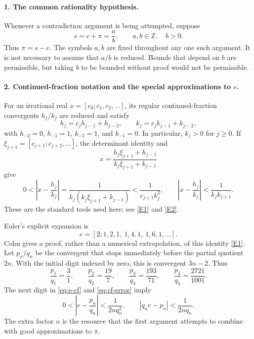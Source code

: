 \documentclass[11pt]{article}
\newcommand{\Z}{\mathbb Z}
\begin{document}
\paragraph{1. The common rationality hypothesis.}
Whenever a contradiction argument is being attempted, suppose
\begin{equation}\label{eq:rationality}
 s=e+\pi=\frac ab,\qquad a,b\in\Z,\quad b>0.
\end{equation}
Thus $\pi=s-e$. The symbols $a,b$ are fixed throughout any one such
argument. It is not necessary to assume that $a/b$ is reduced. Bounds that
depend on $b$ are permissible, but taking $b$ to be bounded without proof
would not be permissible.

\paragraph{2. Continued-fraction notation and the special approximations to $e$.}
For an irrational real $x=[c_0;c_1,c_2,\ldots]$, its regular
continued-fraction convergents $h_j/k_j$ are reduced and satisfy
\[
 h_j=c_jh_{j-1}+h_{j-2},\qquad
 k_j=c_jk_{j-1}+k_{j-2},
\]
with $h_{-2}=0$, $h_{-1}=1$, $k_{-2}=1$, and $k_{-1}=0$.
In particular, $k_j>0$ for $j\ge0$.
If $\xi_{j+1}=[c_{j+1};c_{j+2},\ldots]$, the determinant identity and
\[
 x=\frac{h_j\xi_{j+1}+h_{j-1}}{k_j\xi_{j+1}+k_{j-1}}
\]
give
\begin{equation}\label{eq:cf-error}
 0<\left|x-\frac{h_j}{k_j}\right|
 =\frac1{k_j(k_j\xi_{j+1}+k_{j-1})}
 <\frac1{c_{j+1}k_j^2},\qquad
 \left|x-\frac{h_j}{k_j}\right|<\frac1{k_jk_{j+1}}.
\end{equation}
These are the standard tools used here; see
\href{https://arxiv.org/html/math/0601660v3}{[E1]} and
\href{https://wstein.org/edu/2007/spring/ent/ent-html/node65.html}{[E2]}.

Euler's explicit expansion is
\begin{equation}\label{eq:e-cf}
 e=[2;1,2,1,\ 1,4,1,\ 1,6,1,\ldots].
\end{equation}
Cohn gives a proof, rather than a numerical extrapolation, of this
identity \href{https://arxiv.org/html/math/0601660v3}{[E1]}.
Let $p_n/q_n$ be the convergent that stops immediately before the partial
quotient $2n$. With the initial digit indexed by zero, this is convergent
$3n-2$. Thus
\[
 \frac{p_1}{q_1}=\frac31,\qquad
 \frac{p_2}{q_2}=\frac{19}{7},\qquad
 \frac{p_3}{q_3}=\frac{193}{71},\qquad
 \frac{p_4}{q_4}=\frac{2721}{1001}.
\]
The next digit in \eqref{eq:e-cf} and \eqref{eq:cf-error} imply
\begin{equation}\label{eq:e-small}
 0<\left|e-\frac{p_n}{q_n}\right|<\frac1{2nq_n^2},
 \qquad
 \boxed{|q_ne-p_n|<\frac1{2nq_n}.}
\end{equation}
The extra factor $n$ is the resource that the first argument attempts to
combine with good approximations to $\pi$.
\end{document}
